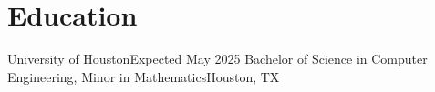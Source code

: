 \section{Education}
    \resumeSubHeadingListStart
    \resumeSubheading
    {University of Houston}{Expected May 2025}
    {Bachelor of Science in Computer Engineering, Minor in Mathematics}{Houston, TX}
    \resumeItemListStart
    \resumeItemListEnd
  \resumeSubHeadingListEnd
